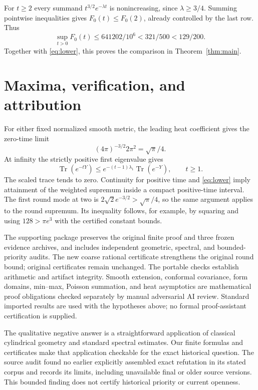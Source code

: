 \documentclass[10pt]{article}
\newcommand{\Tr}{\operatorname{Tr}}
\begin{document}
For \(t\geq2\) every summand \(t^{3/2}e^{-\lambda t}\) is nonincreasing,
since \(\lambda\geq3/4\). Summing pointwise inequalities gives
\(F_0(t)\leq F_0(2)\), already controlled by the last row.
Thus
\[
 \sup_{t>0}F_0(t)\leq641202/10^6<321/500<129/200.
\]
Together with \eqref{eq:lower}, this proves the comparison in
Theorem~\ref{thm:main}.

\section{Maxima, verification, and attribution}
For either fixed normalized smooth metric, the leading heat coefficient
gives the zero-time limit
\[
 (4\pi)^{-3/2}2\pi^2=\sqrt\pi/4.
\]
At infinity the strictly positive first eigenvalue gives
\[
 \Tr(e^{-tY})\leq e^{-(t-1)\lambda_1}\Tr(e^{-Y}),\qquad t\geq1.
\]
The scaled trace tends to zero.
Continuity for positive time and \eqref{eq:lower} imply attainment
of the weighted supremum inside a compact positive-time interval.
The first round mode at two is
\(2\sqrt2e^{-3/2}>\sqrt\pi/4\), so the same argument applies to the
round supremum. Its inequality follows, for example, by squaring
and using \(128>\pi e^3\) with the certified constant bounds.

The supporting package preserves the original finite proof and three
frozen evidence archives, and includes independent geometric,
spectral, and bounded-priority audits. The new coarse rational certificate
strengthens the original round bound; original certificates remain unchanged.
The portable checks establish arithmetic and artifact integrity.
Smooth extension, conformal covariance, form domains, min--max,
Poisson summation, and heat asymptotics are mathematical proof obligations
checked separately by manual adversarial AI review.
Standard imported results are used with the hypotheses above;
no formal proof-assistant certification is supplied.

The qualitative negative answer is a straightforward application of
classical cylindrical geometry and standard spectral estimates.
Our finite formulas and certificates make that application checkable for
the exact historical question. The source audit found no earlier explicitly
assembled exact refutation in its stated corpus and records its limits,
including unavailable final or older source versions. This bounded finding
does not certify historical priority or current openness.
\end{document}
